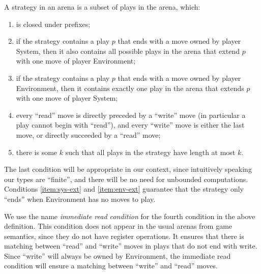 \begin{definition}[Strategy]
    A strategy  in an arena  is a subset of plays in the arena, which: 
    \begin{enumerate}
        \item is closed under prefixes;
        \item\label{item:sys-ext} if the strategy contains a play $p$ that ends with a move owned by player System, then it also contains all possible plays  in the arena that extend $p$ with one move of player Environment;
        \item\label{item:env-ext} if the strategy contains a play $p$ that ends with a move owned by player Environment, then it contains exactly one play  in the arena that extends $p$ with one move of player System;
        \item every ``read'' move is directly preceded by a ``write'' move (in particular a play cannot begin with ``read''), and every ``write'' move is either the last move, or directly succeeded by a ``read'' move;
        \item there is some $k$ such that all plays in the strategy have length at most $k$.
    \end{enumerate}
\end{definition}

The last condition will be appropriate in our context, since intuitively speaking our types are ``finite'', and there will be no need for unbounded computations. Conditions \ref{item:sys-ext} and \ref{item:env-ext} guarantee that the strategy only ``ends'' when 
Environment has no moves to play. 


We use the name \emph{immediate read condition} for the fourth condition in the above definition. This condition does not appear in the usual arenas from game semantics, since they do not have register operations. It ensures that there is matching between ``read'' and ``write'' moves in plays that do not end with write. Since ``write'' will always be owned by Environment, the immediate read condition will ensure a matching between ``write'' and ``read'' moves.

